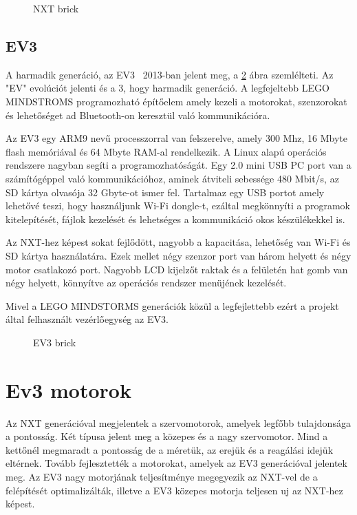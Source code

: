 \begin{figure}[!htb]
	\centering
	\caption{NXT brick}
	\label{fig:NXT}
\end{figure}

\subsection{EV3}

A harmadik generáció, az EV3~\cite{ev3Attribution}\cite{nxtVsEv3} 2013-ban jelent meg, a \ref{fig:EV3} ábra szemlélteti. Az "EV" evolúciót jelenti és a 3, hogy harmadik generáció. A legfejeltebb LEGO MINDSTROMS programozható építőelem amely kezeli a motorokat, szenzorokat és lehetőséget ad Bluetooth-on keresztül való kommunikációra.

Az EV3 egy ARM9 nevű processzorral van felszerelve, amely 300 Mhz, 16 Mbyte flash memóriával és 64 Mbyte RAM-al rendelkezik. A Linux alapú operációs rendszere nagyban segíti a programozhatóságát. Egy 2.0 mini USB PC port van a számítógéppel való kommunikációhoz, aminek átviteli sebessége 480 Mbit/s, az SD kártya olvasója 32 Gbyte-ot ismer fel. Tartalmaz egy USB portot amely lehetővé teszi, hogy használjunk Wi-Fi dongle-t, ezáltal megkönnyíti a programok kitelepítését, fájlok kezelését és lehetséges a kommunikáció okos készülékekkel is.

Az NXT-hez képest sokat fejlődött, nagyobb a kapacitása, lehetőség van Wi-Fi és SD kártya használatára. Ezek mellet négy szenzor port van három helyett és négy motor csatlakozó port. Nagyobb LCD kijelzőt raktak és a felületén hat gomb van négy helyett, könnyítve az operációs rendszer menüjének kezelését.\cite{nxtVsEv3}

Mivel a LEGO MINDSTORMS generációk közül a legfejlettebb ezért a projekt által felhasznált vezérlőegység az EV3.

\begin{figure}[!htb]
	\centering
	\caption{EV3 brick}
	\label{fig:EV3}
\end{figure}


\section{Ev3 motorok}\label{sec:ROBOT:motorok}
Az NXT generációval megjelentek a szervomotorok, amelyek legfőbb tulajdonsága a pontosság. Két típusa jelent meg a közepes és a nagy szervomotor. Mind a kettőnél megmaradt a pontosság de a méretük, az erejük és a reagálási idejük eltérnek. Tovább fejlesztették a motorokat, amelyek az EV3 generációval jelentek meg. Az EV3 nagy motorjának teljesítménye megegyezik az NXT-vel de a felépítését optimalizálták, illetve a EV3 közepes motorja teljesen uj az NXT-hez képest.


